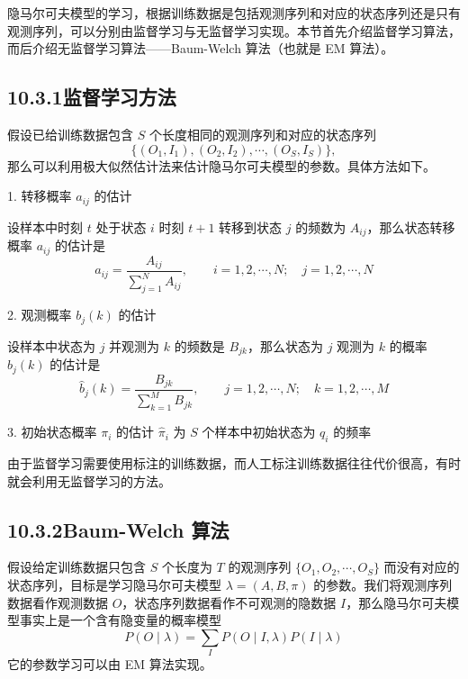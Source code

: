 \documentclass[UTF8,12pt,a4paper,fontset=fandol]{ctexart}
\begin{document}
隐马尔可夫模型的学习，根据训练数据是包括观测序列和对应的状态序列还是只有观测序列，可以分别由监督学习与无监督学习实现。本节首先介绍监督学习算法，而后介绍无监督学习算法——Baum-Welch 算法（也就是 EM 算法）。

\subsection*{10.3.1\quad 监督学习方法}

假设已给训练数据包含 $S$ 个长度相同的观测序列和对应的状态序列
\[
  \{(O_1,I_1),(O_2,I_2),\cdots,(O_S,I_S)\},
\]
那么可以利用极大似然估计法来估计隐马尔可夫模型的参数。具体方法如下。

1. 转移概率 $a_{ij}$ 的估计

设样本中时刻 $t$ 处于状态 $i$ 时刻 $t+1$ 转移到状态 $j$ 的频数为 $A_{ij}$，那么状态转移概率 $a_{ij}$ 的估计是
\begin{equation}
  \hat a_{ij}=\frac{A_{ij}}{\sum_{j=1}^N A_{ij}},\qquad i=1,2,\cdots,N;\quad j=1,2,\cdots,N
  \tag{10.30}
\end{equation}

2. 观测概率 $b_j(k)$ 的估计

设样本中状态为 $j$ 并观测为 $k$ 的频数是 $B_{jk}$，那么状态为 $j$ 观测为 $k$ 的概率 $b_j(k)$ 的估计是
\begin{equation}
  \hat b_j(k)=\frac{B_{jk}}{\sum_{k=1}^M B_{jk}},\qquad j=1,2,\cdots,N;\quad k=1,2,\cdots,M
  \tag{10.31}
\end{equation}

3. 初始状态概率 $\pi_i$ 的估计 $\hat\pi_i$ 为 $S$ 个样本中初始状态为 $q_i$ 的频率

由于监督学习需要使用标注的训练数据，而人工标注训练数据往往代价很高，有时就会利用无监督学习的方法。

\subsection*{10.3.2\quad Baum-Welch 算法}

假设给定训练数据只包含 $S$ 个长度为 $T$ 的观测序列 $\{O_1,O_2,\cdots,O_S\}$ 而没有对应的状态序列，目标是学习隐马尔可夫模型 $\lambda=(A,B,\pi)$ 的参数。我们将观测序列数据看作观测数据 $O$，状态序列数据看作不可观测的隐数据 $I$，那么隐马尔可夫模型事实上是一个含有隐变量的概率模型
\begin{equation}
  P(O\mid\lambda)=\sum_I P(O\mid I,\lambda)P(I\mid\lambda)
  \tag{10.32}
\end{equation}
它的参数学习可以由 EM 算法实现。
\end{document}
